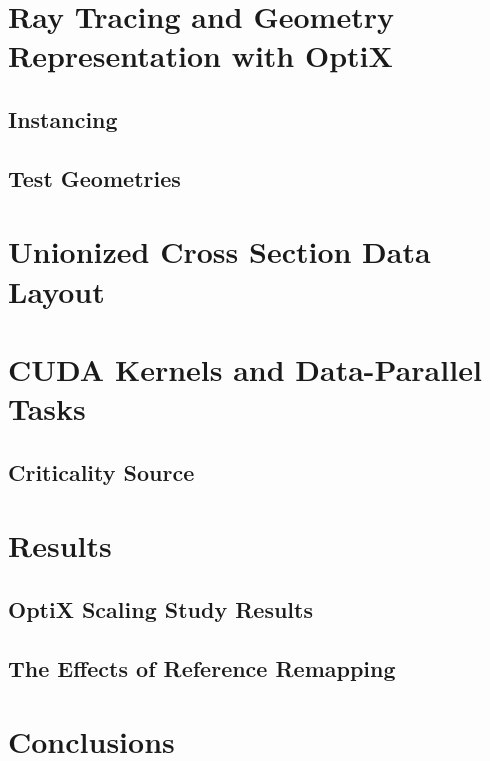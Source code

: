 \documentclass[preprint,12pt]{elsarticle}
\begin{document}
\section{Ray Tracing and Geometry Representation with OptiX}
\label{sec:optix}

\subsection{Instancing}

\subsection{Test Geometries}


\section{Unionized Cross Section Data Layout}
\label{sec:data}



\section{CUDA Kernels and Data-Parallel Tasks}
\label{sec:cuda}


\subsection{Criticality Source}




\section{Results}
\label{sec:results}

\subsection{OptiX Scaling Study Results}


\subsection{The Effects of Reference Remapping}



\section{Conclusions}
\label{sec:conc}
\end{document}
